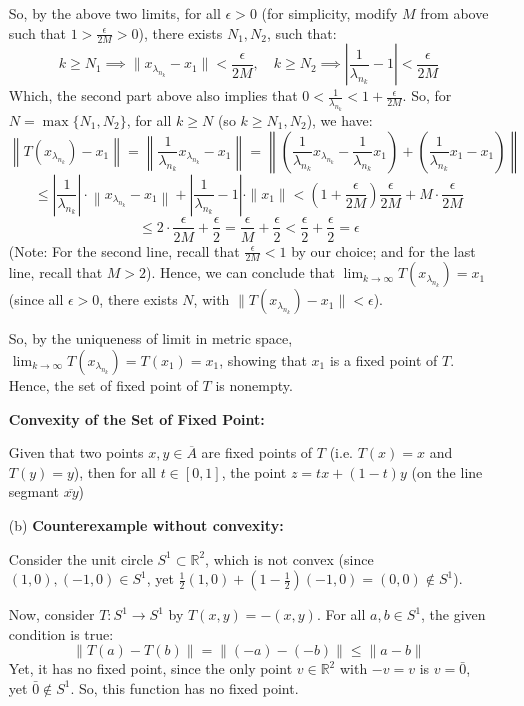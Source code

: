 \documentclass{article}
\begin{document}
\begin{itemize}
    So, by the above two limits, for all $\epsilon>0$ (for simplicity, modify $M$ from above such that $1>\frac{\epsilon}{2M}>0$), there exists $N_1,N_2$, such that:
    $$k\geq N_1 \implies \|x_{\lambda_{n_k}}-x_1\|<\frac{\epsilon}{2M},\quad k\geq N_2 \implies \left|\frac{1}{\lambda_{n_k}}-1\right|<\frac{\epsilon}{2M}$$
    Which, the second part above also implies that $0<\frac{1}{\lambda_{n_k}}<1+\frac{\epsilon}{2M}$.
    So, for $N=\max\{N_1,N_2\}$, for all $k\geq N$ (so $k\geq N_1,N_2$), we have:
    $$\left\|T(x_{\lambda_{n_k}})-x_1\right\| = \left\|\frac{1}{\lambda_{n_k}}x_{\lambda_{n_k}}-x_1\right\| = \left\|\left(\frac{1}{\lambda_{n_k}}x_{\lambda_{n_k}}-\frac{1}{\lambda_{n_k}}x_1\right)+\left(\frac{1}{\lambda_{n_k}}x_1-x_1\right)\right\|$$
    $$\leq \left|\frac{1}{\lambda_{n_k}}\right|\cdot\left\|x_{\lambda_{n_k}}-x_1\right\|+\left|\frac{1}{\lambda_{n_k}}-1\right|\cdot \|x_1\| < \left(1+\frac{\epsilon}{2M}\right)\frac{\epsilon}{2M} + M\cdot \frac{\epsilon}{2M}$$
    $$\leq 2\cdot \frac{\epsilon}{2M}+\frac{\epsilon}{2} = \frac{\epsilon}{M}+\frac{\epsilon}{2} < \frac{\epsilon}{2}+\frac{\epsilon}{2}=\epsilon$$
    (Note: For the second line, recall that $\frac{\epsilon}{2M}<1$ by our choice; and for the last line, recall that $M>2$).
    Hence, we can conclude that $\lim_{k\rightarrow\infty}T(x_{\lambda_{n_k}})=x_1$ (since all $\epsilon>0$, there exists $N$, with $\|T(x_{\lambda_{n_k}})-x_1\| <\epsilon$).

    So, by the uniqueness of limit in metric space, $\lim_{k\rightarrow\infty}T(x_{\lambda_{n_k}}) = T(x_1)=x_1$, showing that $x_1$ is a fixed point of $T$.
    Hence, the set of fixed point of $T$ is nonempty.

    \hfil

    \textbf{Convexity of the Set of Fixed Point:}

    Given that two points $x,y\in\overline{A}$ are fixed points of $T$ (i.e. $T(x)=x$ and $T(y)=y$), then for all $t\in [0,1]$, the point $z=tx+(1-t)y$ (on the line segmant $\overline{xy}$)

    
    \hfil

    \item[(b)] \textbf{Counterexample without convexity:}
    
    Consider the unit circle $S^1 \subset \mathbb{R}^2$, which is not convex (since $(1,0), (-1,0)\in S^1$, yet $\frac{1}{2}(1,0)+(1-\frac{1}{2})(-1,0)=(0,0)\notin S^1$).

    Now, consider $T:S^1\rightarrow S^1$ by $T(x,y)=-(x,y)$. For all $a,b\in S^1$, the given condition is true:
    $$\|T(a)-T(b)\| = \|(-a)-(-b)\| \leq \|a-b\|$$
    Yet, it has no fixed point, since the only point $v\in \mathbb{R}^2$ with $-v = v$ is $v=\bar{0}$, yet $\bar{0}\notin S^1$.
    So, this function has no fixed point.


\end{itemize}
\end{document}
